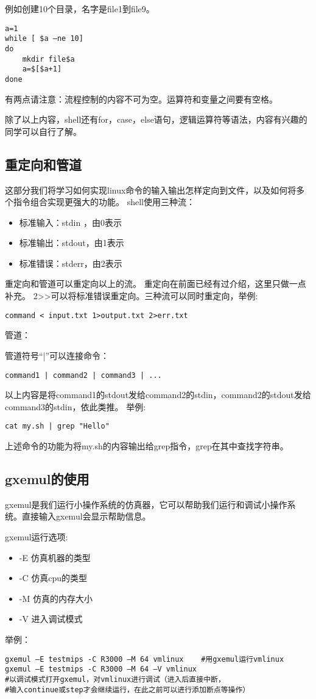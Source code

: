 例如创建10个目录，名字是file1到file9。
\begin{verbatim}
a=1
while [ $a –ne 10]
do
	mkdir file$a
	a=$[$a+1]
done
\end{verbatim}
有两点请注意：流程控制的内容不可为空。运算符和变量之间要有空格。

除了以上内容，shell还有for，case，else语句，逻辑运算符等语法，内容有兴趣的同学可以自行了解。

\subsection{重定向和管道}
这部分我们将学习如何实现linux命令的输入输出怎样定向到文件，以及如何将多个指令组合实现更强大的功能。
shell使用三种流：
\begin{itemize}
\item 标准输入：stdin ，由0表示
\item 标准输出：stdout，由1表示
\item 标准错误：stderr，由2表示
\end{itemize}
重定向和管道可以重定向以上的流。
重定向在前面已经有过介绍，这里只做一点补充。
2>>可以将标准错误重定向。三种流可以同时重定向，举例:
\begin{verbatim}
command < input.txt 1>output.txt 2>err.txt
\end{verbatim}
管道：

管道符号“|”可以连接命令：
\begin{verbatim}
command1 | command2 | command3 | ...
\end{verbatim}
以上内容是将command1的stdout发给command2的stdin，command2的stdout发给command3的stdin，依此类推。
举例:
\begin{verbatim}
cat my.sh | grep "Hello"
\end{verbatim}
上述命令的功能为将my.sh的内容输出给grep指令，grep在其中查找字符串。

\subsection{gxemul的使用}
gxemul是我们运行小操作系统的仿真器，它可以帮助我们运行和调试小操作系统。直接输入gxemul会显示帮助信息。

gxemul运行选项:
\begin{itemize}
\item -E 仿真机器的类型
\item -C 仿真cpu的类型
\item -M 仿真的内存大小
\item -V 进入调试模式
\end{itemize}
举例：
\begin{verbatim}
gxemul –E testmips -C R3000 –M 64 vmlinux    #用gxemul运行vmlinux
gxemul –E testmips -C R3000 –M 64 –V vmlinux
#以调试模式打开gxemul，对vmlinux进行调试（进入后直接中断，
#输入continue或step才会继续运行，在此之前可以进行添加断点等操作）
\end{verbatim}

